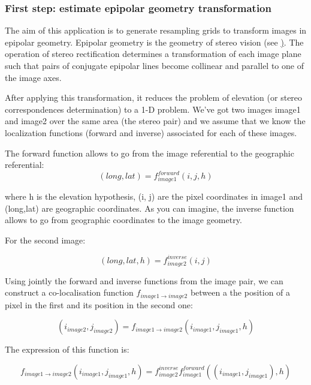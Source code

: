 \subsubsection{First step: estimate epipolar geometry transformation}\label{ssec:epipolar}
The aim of this application is to generate resampling grids to transform images
in epipolar geometry.  Epipolar geometry is the geometry of stereo vision (see
\href{http://en.wikipedia.org/wiki/Epipolar_geometry}). The operation of stereo
rectification determines a transformation of each image plane such that pairs of
conjugate epipolar lines become collinear and parallel to one of the image axes.

After applying this transformation, it reduces the problem of elevation (or
stereo correspondences determination) to a 1-D problem.  We've got two images
image1 and image2 over the same area (the stereo pair) and we assume that we
know the localization functions (forward and inverse) associated for each of
these images.

The forward function allows to go from the image referential to the geographic
referential:
\begin{equation}
  (long,lat) = f^{forward}_{image1}(i,j,h)
\end{equation}

where h is the elevation hypothesis, (i, j) are the pixel coordinates in image1
and (long,lat) are geographic coordinates.  As you can imagine, the inverse
function allows to go from geographic coordinates to the image geometry.

For the second image:

\begin{equation}
   (long,lat,h) = f^{inverse}_{image2}(i,j)
\end{equation}

Using jointly the forward and inverse functions from the image pair, we can
construct a co-localisation function $f_{image1 \rightarrow image2}$ between a
the position of a pixel in the first and its position in the second one:

\begin{equation}
(i_{image2},j_{image2}) = f_{image1 \rightarrow image2} (i_{image1} , j_{image1} , h)
\end{equation}

The expression of this function is:

\begin{equation}
f_{image1 \rightarrow image2} (i_{image1} , j_{image1} , h) =  f^{inverse}_{image2} f^{forward}_{image1}((i_{image1} , j_{image1}), h)
\end{equation}

